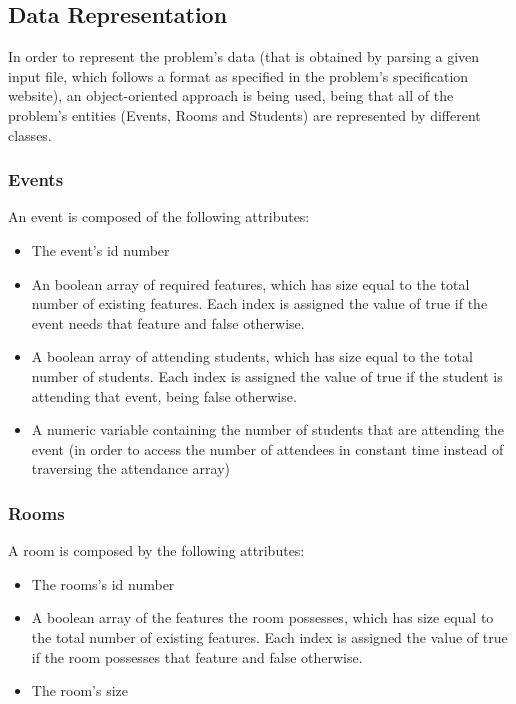 \documentclass[conference]{IEEEtran}
\begin{document}
\subsection{Data Representation}

In order to represent the problem's data (that is obtained by parsing a given input file, which follows a format as specified in the problem's specification website), an object-oriented approach is being used, being that all of the problem's entities (Events, Rooms and Students) are represented by different classes.

\subsubsection{Events}

An event is composed of the following attributes:
\begin{itemize}
    \item The event's id number
    \item An boolean array of required features, which has size equal to the total number of existing features. Each index is assigned the value of true if the event needs that feature and false otherwise.
    \item A boolean array of attending students, which has size equal to the total number of students. Each index is assigned the value of true if the student is attending that event, being false otherwise.
    \item A numeric variable containing the number of students that are attending the event (in order to access the number of attendees in constant time instead of traversing the attendance array)
\end{itemize}

\subsubsection{Rooms}

A room is composed by the following attributes:
\begin{itemize}
    \item The rooms's id number
    \item A boolean array of the features the room possesses, which has size equal to the total number of existing features. Each index is assigned the value of true if the room possesses that feature and false otherwise.
    \item The room's size
\end{itemize}
\end{document}
